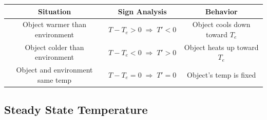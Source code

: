 \documentclass[09pt,letterpaper]{article}
\begin{document}
\begin{center}
\renewcommand{\arraystretch}{1.4}
\begin{tabular}{|c|c|c|}
\hline
\textbf{Situation} & \textbf{Sign Analysis} & \textbf{Behavior} \\
\hline
Object warmer than environment 
& 
$T-T_e>0 \;\Rightarrow\; T'<0$ 
& 
Object cools down toward $T_e$ \\
\hline
Object colder than environment 
& 
$T-T_e<0 \;\Rightarrow\; T'>0$ 
& 
Object heats up toward $T_e$ \\
\hline
Object and environment same temp 
& 
$T-T_e=0 \;\Rightarrow\; T'=0$ 
& 
Object's temp is fixed \\
\hline
\end{tabular}
\end{center}

\subsection{Steady State Temperature}
\end{document}
